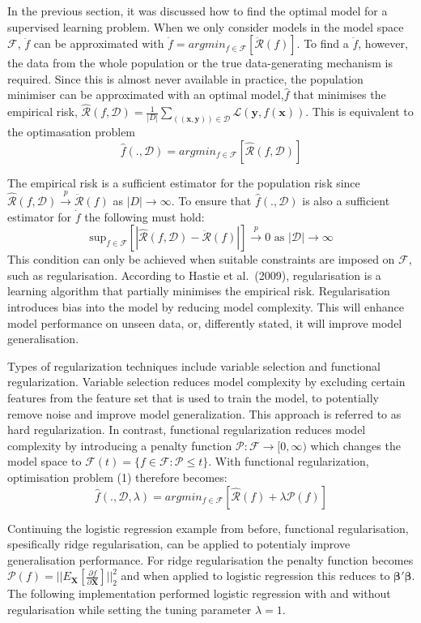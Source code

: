 \documentclass[11pt]{article}
\begin{document}
In the previous section, it was discussed how to find the optimal model
for a supervised learning problem. When we only consider models in the
model space \(\mathcal{F}\), \(\ddot{f}\) can be approximated with
\(\dot{f}=argmin_{f\in \mathcal{F}}[\ddot{\mathcal{R}}(f)]\). To find a
\(\dot{f}\), however, the data from the whole population or the true
data-generating mechanism is required. Since this is almost never
available in practice, the population minimiser can be approximated with
an optimal model,\(\hat{f}\) that minimises the empirical risk,
\(\hat{\mathcal{R}}(f,\mathcal{D})=\frac{1}{|D|}\sum_{(\mathbf{(x,y)})\in \mathcal{D}}\mathcal{L}(\mathbf{y},f(\mathbf{x}))\).
This is equivalent to the optimasation problem
\[\hat{f}(.,\mathcal{D})=argmin_{f\in \mathcal{F}}[\hat{\mathcal{R}}(f,\mathcal{D})] \tag{1}\]

The empirical risk is a sufficient estimator for the population risk
since
\(\hat{\mathcal{R}}(f,\mathcal{D})\overset{p}{\rightarrow}\ddot{\mathcal{R}}(f)\)
as \(|D|\rightarrow\infty\). To ensure that \(\hat{f}(.,\mathcal{D})\)
is also a sufficient estimator for \(\dot{f}\) the following must hold:
\[\text{sup}_{f\in \mathcal{F}}[|\hat{\mathcal{R}}(f,\mathcal{D})-\ddot{\mathcal{R}}(f)|]\overset{p}{\rightarrow}0\text{ as }|\mathcal{D}|\rightarrow\infty\]
This condition can only be achieved when suitable constraints are
imposed on \(\mathcal{F}\), such as regularisation. According to Hastie
et al.~(2009), regularisation is a learning algorithm that partially
minimises the empirical risk. Regularisation introduces bias into the
model by reducing model complexity. This will enhance model performance
on unseen data, or, differently stated, it will improve model
generalisation.

Types of regularization techniques include variable selection and
functional regularization. Variable selection reduces model complexity
by excluding certain features from the feature set that is used to train
the model, to potentially remove noise and improve model generalization.
This approach is referred to as hard regularization. In contrast,
functional regularization reduces model complexity by introducing a
penalty function \(\mathcal{P:F}\rightarrow [0,\infty)\) which changes
the model space to
\(\mathcal{F}(t)=\{f\in \mathcal{F}:\mathcal{P}\le t\}\). With
functional regularization, optimisation problem (1) therefore becomes:
\[\hat{f}(.,\mathcal{D},\lambda)=argmin_{f\in \mathcal{F}}[\hat{\mathcal{R}}(f)+\lambda \mathcal{P}(f)] \]

Continuing the logistic regression example from before, functional
regularisation, spesifically ridge regularisation, can be applied to
potentialy improve generalisation performance. For ridge regularisation
the penalty function becomes
\(\mathcal{P}(f)=||E_{\mathbf{X}}[\frac{\partial f}{\partial \mathbf{X}}]||^2_2\)
and when applied to logistic regression this reduces to
\(\mathbf{\beta}'\mathbf{\beta}\). The following implementation
performed logistic regression with and without regularisation while
setting the tuning parameter \(\lambda=1\).
\end{document}
